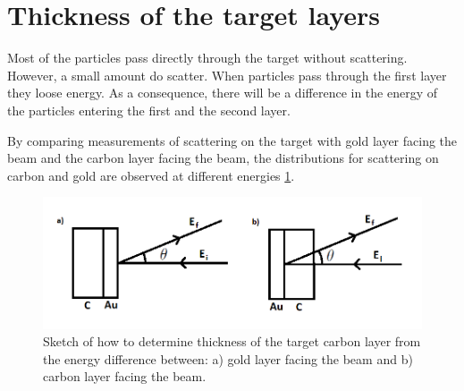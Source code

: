 \section{Thickness of the target layers} 
Most of the particles pass directly through the target without scattering. However, a small amount do scatter. When particles pass through the first layer they loose energy. As a consequence, there will be a difference in the energy of the particles entering the first and the second layer. 

By comparing measurements of scattering on the target with gold layer facing the beam and the carbon layer facing the beam, the distributions for scattering on carbon and gold are observed at different energies \cref{fig_sketch_thickness}. 

\begin{figure}[h]
\centering
\includegraphics[width=0.99\columnwidth]{tykkelse.png}
\caption{Sketch of how to determine thickness of the target carbon layer from the energy difference between: a) gold layer facing the beam and b) carbon layer facing the beam.}
\label{fig_sketch_thickness}
\end{figure}



